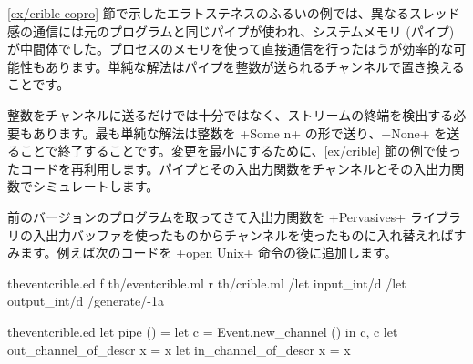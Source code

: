 \begin{example}
\ref{ex/crible-copro} 節で示したエラトステネスのふるいの例では、異なるスレッド感の通信には元のプログラムと同じパイプが使われ、システムメモリ (パイプ) が中間体でした。プロセスのメモリを使って直接通信を行ったほうが効率的な可能性もあります。単純な解法はパイプを整数が送られるチャンネルで置き換えることです。

整数をチャンネルに送るだけでは十分ではなく、ストリームの終端を検出する必要もあります。最も単純な解法は整数を \ml+Some n+ の形で送り、\ml+None+ を送ることで終了することです。変更を最小にするために、\ref{ex/crible} 節の例で使ったコードを再利用します。パイプとその入出力関数をチャンネルとその入出力関数でシミュレートします。

前のバージョンのプログラムを取ってきて入出力関数を \ml+Pervasives+ ライブラリの入出力バッファを使ったものからチャンネルを使ったものに入れ替えればすみます。例えば次のコードを \ml+open Unix+ 命令の後に追加します。
%
\begin{codefile}{theventcrible.ed}
f th/eventcrible.ml
r th/crible.ml
/let input_int/d
/let output_int/d
/generate/-1a
\end{codefile}
%
\begin{listingcodefile}{theventcrible.ed}
let pipe () = let c = Event.new_channel () in c, c
let out_channel_of_descr x = x
let in_channel_of_descr x = x


\end{listingcodefile}
\end{example}
